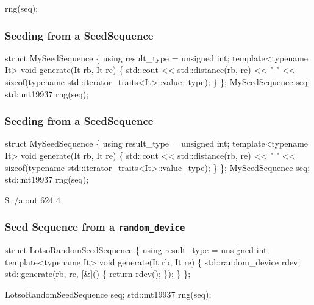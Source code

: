\documentclass[aspectratio=169]{beamer}
\begin{document}
\begin{frame}[fragile]
\begin{semiverbatim}
rng(seq);



\end{semiverbatim}
\end{frame}


\begin{frame}[fragile]
\frametitle{Seeding from a SeedSequence}

\begin{semiverbatim}
{\color{blue}struct} MySeedSequence \{
  {\color{blue}using} result_type = {\color{blue}unsigned int};
  {\color{blue}template}<{\color{blue}typename} It>
  {\color{blue}void} generate(It rb, It re)
  \{
    std::cout << std::distance(rb, re) << " "
      << {\color{blue}sizeof}({\color{blue}typename} std::iterator_traits<It>::value_type);
  \}
\};
MySeedSequence seq;
std::mt19937 rng(seq);



\end{semiverbatim}
\end{frame}


\begin{frame}[fragile]
\frametitle{Seeding from a SeedSequence}

\begin{semiverbatim}
{\color{blue}struct} MySeedSequence \{
  {\color{blue}using} result_type = {\color{blue}unsigned int};
  {\color{blue}template}<{\color{blue}typename} It>
  {\color{blue}void} generate(It rb, It re)
  \{
    std::cout << std::distance(rb, re) << " "
      << {\color{blue}sizeof}({\color{blue}typename} std::iterator_traits<It>::value_type);
  \}
\};
MySeedSequence seq;
std::mt19937 rng(seq);

\$ ./a.out
{\color{red}624 4}
\end{semiverbatim}
\end{frame}


\begin{frame}[fragile]

  \frametitle{Seed Sequence from a \texttt{random\_device}}

  \begin{semiverbatim}
{\color{blue}struct} LotsoRandomSeedSequence \{
  {\color{blue}using} result_type = {\color{blue}unsigned int};
  {\color{blue}template}<{\color{blue}typename} It>
  {\color{blue}void} generate(It rb, It re)
  \{
    std::random_device rdev;
    std::generate(rb, re, [&]() \{ return rdev(); \});
  \}
\};

LotsoRandomSeedSequence seq;
std::mt19937 rng(seq);
  \end{semiverbatim}

\end{frame}
\end{document}
